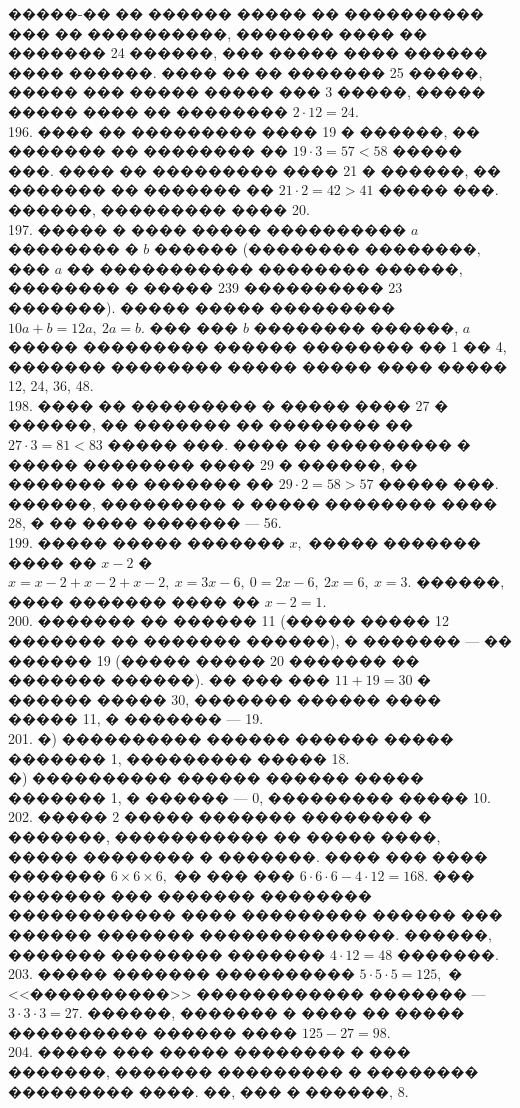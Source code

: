 \documentclass[12pt]{article}
\begin{document}
�����-�� �� ������ ����� �� ���������� ��� �� ����������, ������� ���� �� ������� 24 ������, ��� ����� ���� ������ ���� ������. ���� �� �� ������� 25 �����, ����� ��� ����� ����� ��� 3 �����, ����� ����� ���� �� �������� $2\cdot12=24.$\\
196. ���� �� ��������� ���� 19 � ������, �� ������� �� �������� �� $19\cdot3=57<58$ ����� ���. ���� �� ��������� ���� 21 � ������, �� ������� �� ������� �� $21\cdot2=42>41$ ����� ���. ������, ��������� ���� 20.\\
197. ����� � ���� ����� ���������� $a$ �������� � $b$ ������ (�������� ��������, ��� $a$ �� ����������� �������� ������, �������� � ����� 239 ���������� 23 �������). ����� ����� ��������� $10a+b=12a,\ 2a=b.$ ��� ��� $b$ �������� ������, $a$ ����� ��������� ������ �������� �� 1 �� 4, ������� �������� ����� ����� ���� ����� 12, 24, 36, 48.\\
198. ���� �� ��������� � ����� ���� 27 � ������, �� ������� �� �������� �� $27\cdot3=81<83$ ����� ���. ���� �� ��������� � ����� �������� ���� 29 � ������, �� ������� �� ������� �� $29\cdot2=58>57$ ����� ���. ������, ��������� � ����� �������� ���� 28, � �� ���� ������� --- 56.\\
199. ����� ����� ������� $x,$  ����� ������� ���� �� $x-2$ � $x=x-2+x-2+x-2,\ x=3x-6,\ 0=2x-6,\ 2x=6,\ x=3.$ ������, ���� ������� ���� �� $x-2=1.$\\
200. ������� �� ������ 11 (����� ����� 12 ������� �� ������� ������), � ������� --- �� ������ 19 (����� ����� 20 ������� �� ������� ������). �� ��� ��� $11+19=30$ � ������ ����� 30, ������� ������ ���� ����� 11, � ������� --- 19.\\
201. �) ���������� ������ ������ ����� ������� 1, ��������� ����� 18.\\
�) ���������� ������ ������ ����� ������� 1, � ������ --- 0, ��������� ����� 10.\\
202. ����� 2 ����� ������� �������� � �������, ����������� �� ����� ����, ����� �������� � �������. ���� ��� ���� ������� $6\times6\times6,$ �� ��� ��� $6\cdot6\cdot6-4\cdot12=168.$ ��� ������� ��� ������� �������� ������������ ���� ��������� ������ ��� ������ ������� ��������������. ������, ������� �������� ������� $4\cdot12=48$ �������.\\
203. ����� ������� ���������� $5\cdot5\cdot5=125,$ � <<����������>> ������������ ������� --- $3\cdot3\cdot3=27.$ ������, ������� � ���� �� ����� ���������� ������ ���� $125-27=98.$\\
204. ����� ��� ����� �������� � ��� �������, ������� ��������� � �������� ��������� ����. ��, ��� � ������, 8.\\
\end{document}
